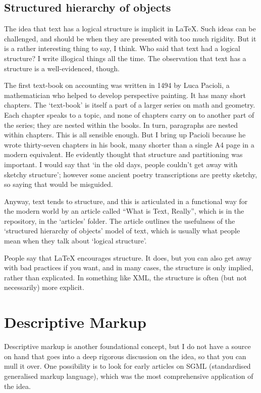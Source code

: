 \documentclass[12pt, oneside]{memoir}
\begin{document}
\subsection{Structured hierarchy of objects}
The idea that text has a logical structure is implicit in \LaTeX{}. Such ideas can be challenged, and should be when they are presented with too much rigidity. But it is a rather interesting thing to say, I think. Who said that text had a logical structure? I write illogical things all the time. The observation that text has a structure is a well-evidenced, though.

The first text-book on accounting was written in 1494 by Luca Pacioli, a mathematician who helped to develop perspective painting. It has many short chapters. The `text-book' is itself a part of a larger series on math and geometry. Each chapter speaks to a topic, and none of chapters carry on to another part of the series; they are nested within the books. In turn, paragraphs are nested within chapters. This is all sensible enough. But I bring up Pacioli because he wrote thirty-seven chapters in his book, many shorter than a single A4 page in a modern equivalent. He evidently thought that structure and partitioning was important. I would say that `in the old days, people couldn't get away with sketchy structure'; however some ancient poetry transcriptions are pretty sketchy, so saying that would be misguided.

Anyway, text tends to structure, and this is articulated in a functional way for the modern world by an article called ``What is Text, Really'', which is in the repository, in the `articles' folder. The article outlines the usefulness of the `structured hierarchy of objects' model of text, which is usually what people mean when they talk about `logical structure'.

People say that \LaTeX{} encourages structure. It does, but you can also get away with bad practices if you want, and in many cases, the structure is only implied, rather than explicated. In something like XML, the structure is often (but not necessarily) more explicit.

\section{Descriptive Markup}
Descriptive markup is another foundational concept, but I do not have a source on hand that goes into a deep rigorous discussion on the idea, so that you can mull it over. One possibility is to look for early articles on SGML (standardised generalised markup language), which was the most comprehensive application of the idea.
\end{document}
